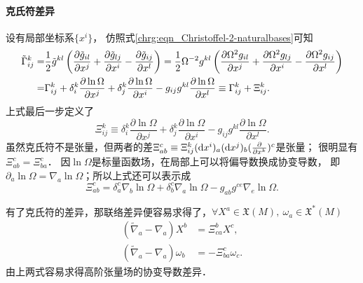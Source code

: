 \paragraph{克氏符差异}
设有局部坐标系$\{x^i\}$，
仿照式\eqref{chrg:eqn_Christoffel-2-naturalbases}可知
\begin{align}
    \tilde{\Gamma}_{ij}^k =& \frac{1}{2} \tilde{g}^{kl} \left( \frac{\partial \tilde{g}_{il}  }{\partial x^j}
        + \frac{\partial \tilde{g}_{lj} } {\partial x^i}  - \frac{\partial \tilde{g}_{ij}} {\partial x^l} \right)
        =\frac{1}{2} \Omega^{-2}{g}^{kl} \left( \frac{\partial \Omega^{2}{g}_{il}  }{\partial x^j}
        + \frac{\partial \Omega^{2}{g}_{lj} } {\partial x^i}  
        - \frac{\partial \Omega^{2}{g}_{ij}} {\partial x^l} \right) \notag \\
      =&\Gamma_{ij}^k+ \delta_i^k \frac{\partial \ln \Omega  }{\partial x^j}
      + \delta_j^k \frac{\partial \ln\Omega} {\partial x^i}
      - {g}_{ij} {g}^{kl}\frac{\partial \ln\Omega} {\partial x^l}
      \equiv \Gamma_{ij}^k+ \Xi_{ij}^k. \label{chrg:eqn_conformal-Gamma}
\end{align}
上式最后一步定义了
\begin{equation}\label{chrg:eqn_conformal-Xi}
    \Xi_{ij}^k \equiv \delta_i^k \frac{\partial \ln \Omega  }{\partial x^j}
    + \delta_j^k \frac{\partial \ln\Omega} {\partial x^i}
    - {g}_{ij} {g}^{kl}\frac{\partial \ln\Omega} {\partial x^l} .
\end{equation}
虽然克氏符不是张量，但两者的差$\Xi_{ab}^c\equiv \Xi_{ij}^k ({\rm d}x^i)_a ({\rm d}x^j)_b
(\frac{\partial}{\partial x^k} )^c$是张量；
很明显有$\Xi_{ab}^c=\Xi_{ba}^c$．
因$\ln \Omega$是标量函数场，在局部上可以将偏导数换成协变导数，
即$\partial_a \ln \Omega = \nabla_a\ln \Omega$；所以上式还可以表示成
\begin{equation}\label{chrg:eqn_conformal-Xi-nabla}
    \Xi_{ab}^c = \delta_a^c \nabla_b\ln \Omega + \delta_b^c \nabla_a\ln \Omega
    - {g}_{ab} {g}^{ce}\nabla_e\ln \Omega .
\end{equation}

有了克氏符的差异，那联络差异便容易求得了，$\forall X^a\in \mathfrak{X}(M),\ \omega_a \in \mathfrak{X}^*(M)$
\begin{align}
    (\tilde{\nabla}_a-\nabla_a) X^b & = \Xi_{ca}^b X^c,    \label{chrg:eqn_conformal-X-D} \\
    (\tilde{\nabla}_a-\nabla_a) \omega_b & = -\Xi_{ba}^c \omega_c.    \label{chrg:eqn_conformal-w-D}
\end{align}
由上两式容易求得高阶张量场的协变导数差异．





